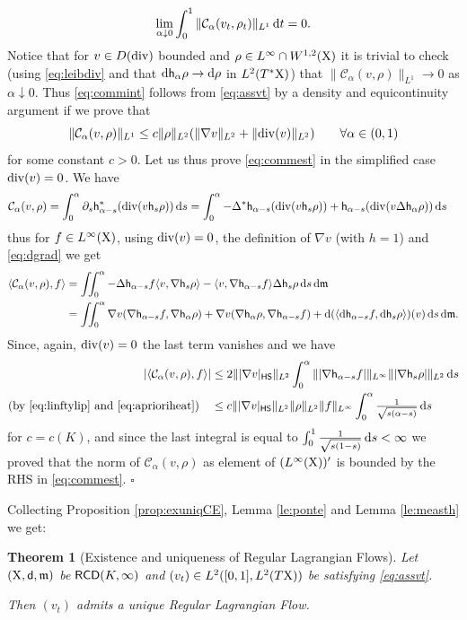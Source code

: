 \documentclass[11pt]{article}
\numberwithin{equation}{section}
\newtheorem{theorem}{Theorem}[section]
\newenvironment{idea}{\removelastskip\par\medskip   %
\noindent{\em Idea of the proof} \rm}{\penalty-20\null\hfill$\square$\par\medbreak}
\newcommand{\X}{{\rm X}}
\newcommand{\sfd}{{\sf d}}
\newcommand{\mm}{{\mathfrak m}}
\newcommand{\RCD}{{\sf RCD}}
\renewcommand{\d}{{\rm d}}
\renewcommand{\div}{{\rm div}}
\newcommand{\h}{{\sf h}} %
\newcommand\la{\langle}
\newcommand\ra{\rangle}
\newcommand{\HS}{\sf HS}
\begin{document}
\begin{idea}
\begin{equation}
\label{eq:commint}
\lim_{\alpha \downarrow0}\int_0^1\|\mathcal C_\alpha(v_t,\rho_t)\|_{L^1}\,\d t=0.
\end{equation}
Notice that for $v\in D(\div)$ bounded and $\rho\in L^\infty\cap W^{1,2}(\X)$ it is trivial to check (using \eqref{eq:leibdiv} and that $\d\h_\alpha\rho\to\d\rho$ in $L^2(T^*\X)$) that $\|\mathcal C_\alpha(v,\rho)\|_{L^1}\to 0$ as $\alpha\downarrow0$. Thus \eqref{eq:commint} follows from \eqref{eq:assvt} by a density and equicontinuity argument if we prove that
\begin{equation}
\label{eq:commest}
\|\mathcal C_\alpha(v,\rho)\|_{L^1}\leq c\|\rho\|_{L^2}(\|\nabla v\|_{L^2}+\|\div (v)\|_{L^2})\qquad\forall \alpha\in(0,1)
\end{equation}
for some constant $c>0$. Let us thus prove \eqref{eq:commest} in the simplified case $\div(v)=0$. We have
\[
\begin{split}
\mathcal C_\alpha(v,\rho)&=\int_0^\alpha\partial_s \h^*_{\alpha-s}(\div(v\h_s\rho))\,\d s=\int_0^\alpha -\Delta^*\h_{\alpha-s}(\div(v\h_s\rho))+\h_{\alpha-s}(\div(v\Delta\h_\alpha\rho))\,\d s
\end{split}
\]
thus for  $f\in L^\infty(\X)$, using $\div(v)=0$, the definition of $\nabla v$ (with $h=1$) and \eqref{eq:dgrad}  we get
\[
\begin{split}
\la \mathcal C_\alpha(v,\rho),f\ra&=\iint_0^\alpha- \Delta\h_{\alpha-s}f\la v,\nabla\h_s\rho\ra -\la v,\nabla\h_{\alpha-s}f\ra \Delta\h_s\rho\,\d s\,\d\mm\\
&=\iint_0^\alpha \nabla v(\nabla\h_{\alpha-s}f,\nabla\h_\alpha\rho) + \nabla v(\nabla\h_\alpha\rho,\nabla\h_{\alpha-s}f) +\d(\la\d\h_{\alpha-s}f,\d\h_s\rho\ra)(v)\,\d s\,\d\mm.
\end{split}
\]
Since, again, $\div(v)=0$ the last term vanishes and we have
\[
\begin{split}
|\la \mathcal C_\alpha(v,\rho),f\ra|&\leq 2\||\nabla v|_{\HS}\|_{L^2}\int_0^\alpha \||\nabla\h_{\alpha-s}f |\|_{L^\infty} \||\nabla\h_{s}\rho |\|_{L^2}\,\d s\\
\text{(by \eqref{eq:linftylip} and \eqref{eq:aprioriheat})}\quad&\leq c\||\nabla v|_{\HS}\|_{L^2}\|\rho\|_{L^2}\|f\|_{L^\infty}\int_0^\alpha\tfrac1{\sqrt{s(\alpha-s)}}\,\d s%
\end{split}
\]
for $c=c(K)$, and since the last integral is equal to $\int_0^1\tfrac1{\sqrt {s(1-s)}}\,\d s<\infty$ we proved that the norm of $\mathcal C_\alpha(v,\rho)$ as element of $(L^\infty(\X))'$ is bounded by the RHS in \eqref{eq:commest}. 
\end{idea}
Collecting Proposition \ref{prop:exuniqCE}, Lemma \ref{le:ponte} and Lemma \ref{le:measth} we  get:
\begin{theorem}[Existence and uniqueness of Regular Lagrangian Flows]\label{thm:RLF} Let $(\X,\sfd,\mm)$ be $\RCD(K,\infty)$ and $(v_t)\in L^2([0,1],L^2(T\X))$ be satisfying \eqref{eq:assvt}.

Then $(v_t)$ admits a unique Regular Lagrangian Flow.
\end{theorem}
\end{document}
